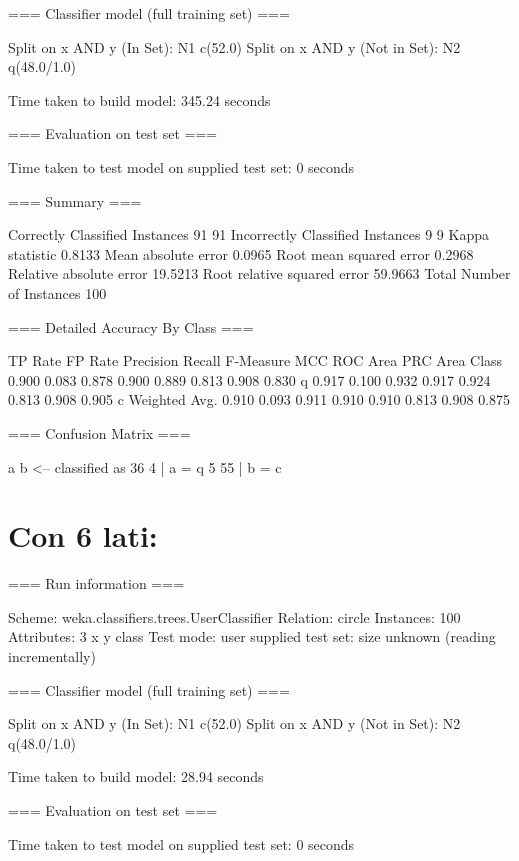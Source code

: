 \documentclass{report}
\begin{document}
	=== Classifier model (full training set) ===
	
	
	Split on x AND y (In Set): N1 c(52.0)
	Split on x AND y (Not in Set): N2 q(48.0/1.0)
	
	Time taken to build model: 345.24 seconds
	
	=== Evaluation on test set ===
	
	Time taken to test model on supplied test set: 0 seconds
	
	=== Summary ===
	
	Correctly Classified Instances          91               91      %
	Incorrectly Classified Instances         9                9      %
	Kappa statistic                          0.8133
	Mean absolute error                      0.0965
	Root mean squared error                  0.2968
	Relative absolute error                 19.5213 %
	Root relative squared error             59.9663 %
	Total Number of Instances              100     
	
	=== Detailed Accuracy By Class ===
	
	TP Rate  FP Rate  Precision  Recall   F-Measure  MCC      ROC Area  PRC Area  Class
	0.900    0.083    0.878      0.900    0.889      0.813    0.908     0.830     q
	0.917    0.100    0.932      0.917    0.924      0.813    0.908     0.905     c
	Weighted Avg.    0.910    0.093    0.911      0.910    0.910      0.813    0.908     0.875     
	
	=== Confusion Matrix ===
	
	a  b   <-- classified as
	36  4 |  a = q
	5 55 |  b = c
	
	
	\section{Con 6 lati:}
	=== Run information ===
	
	Scheme:       weka.classifiers.trees.UserClassifier 
	Relation:     circle
	Instances:    100
	Attributes:   3
	x
	y
	class
	Test mode:    user supplied test set:  size unknown (reading incrementally)
	
	=== Classifier model (full training set) ===
	
	
	Split on x AND y (In Set): N1 c(52.0)
	Split on x AND y (Not in Set): N2 q(48.0/1.0)
	
	Time taken to build model: 28.94 seconds
	
	=== Evaluation on test set ===
	
	Time taken to test model on supplied test set: 0 seconds
	
\end{document}
